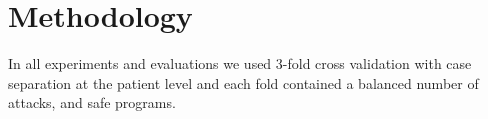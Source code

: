 \section{Methodology}\label{method}
In all experiments and evaluations we used 3-fold cross validation with case separation at
the patient level and each fold contained a balanced number
of attacks, and safe programs.





